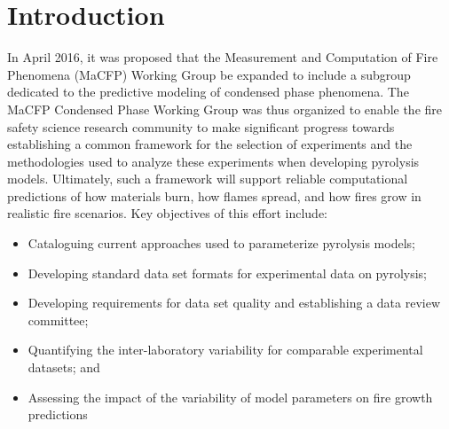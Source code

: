 \documentclass{book}
\begin{document}
\newpage
\thispagestyle{fancy}
\tableofcontents

\mainmatter
\pagestyle{fancy}

\chapter{Introduction}
In April 2016, it was proposed that the Measurement and Computation of Fire Phenomena (MaCFP) Working Group be expanded to include a subgroup dedicated to the predictive modeling of condensed phase phenomena. The MaCFP Condensed Phase Working Group was thus organized to enable the fire safety science research community to make significant progress towards establishing a common framework for the selection of experiments and the methodologies used to analyze these experiments when developing pyrolysis models. Ultimately, such a framework will support reliable computational predictions of how materials burn, how flames spread, and how fires grow in realistic fire scenarios. Key objectives of this effort include:
\begin{itemize}
 \item Cataloguing current approaches used to parameterize pyrolysis models;
 \item Developing standard data set formats for experimental data on pyrolysis;
 \item Developing requirements for data set quality and establishing a data review committee;
 \item Quantifying the inter-laboratory variability for comparable experimental datasets; and
 \item Assessing the impact of the variability of model parameters on fire growth predictions
\end{itemize}
\end{document}

